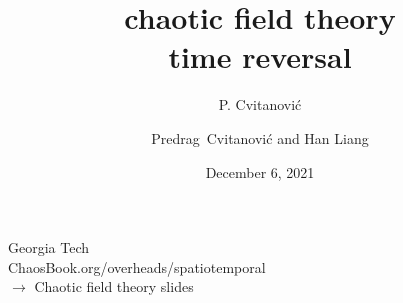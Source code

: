 

                        \newif\ifboyscout\boyscouttrue          %
                        \newif\ifsubmission\submissionfalse     %
                        \newif\ifblog\blogfalse %


\usepackage[font=scriptsize, labelfont=bf]{caption}
\usepackage[
    backend=biber,  %
    sorting=nyt,
    style=numeric, %
    natbib=true,
    style=phys, %
    biblabel= brackets, %
    articletitle=false, %
    pageranges = true , %
    sortlocale=en_US,
    firstinits=true,
    url=false, %
    doi=false, %
    eprint=false
]{biblatex}




\renewcommand{\statesp}{state space}
\renewcommand{\Statesp}{State space}
\renewcommand{\Refl}{\ensuremath{\sigma}}             %
\renewcommand{\shift}{\ensuremath{r}}
\renewcommand{\hopMat}{\shift} %
\renewcommand{\ssp}{\ensuremath{\phi}}             %
\renewcommand{\Ssym}[1]{{\ensuremath{m_{#1}}}}    %



\title{
{\huge chaotic field theory %
    \\
        time reversal}
}
\author{P. Cvitanovi\'c}
\author[Cvitanovi\'c]
{
  \textcolor{green!50!black}{
  {
Predrag~Cvitanovi\'c
   and
Han Liang
  }	%
  }
}
\institute
{               Georgia Tech     \\
                {\scriptsize
 ChaosBook.org/overheads/spatiotemporal \\
 $\to$ Chaotic field theory slides    }
 }
\date{December 6, 2021}

